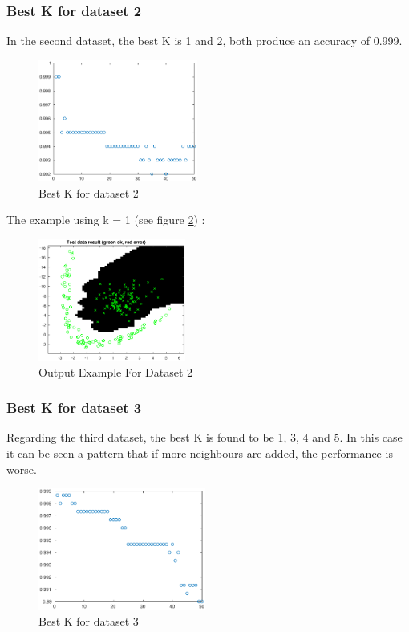 \documentclass{article}
\begin{document}
\subsubsection {Best K for dataset 2}
In the second dataset, the best K is 1 and 2, both produce an accuracy of 0.999.

\begin{figure}[H]
\centering
\includegraphics[height=4cm]{images/bestkdataset2}
\caption{Best K for dataset 2}
\label{fig:bestkdataset2}
\end{figure}

The example using k = 1 (see figure \ref{fig:resultsknn2}) :

\begin{figure}[H]
\centering
\includegraphics[height=4cm]{images/resultsknn2}
\caption{Output Example For Dataset 2}
\label{fig:resultsknn2}
\end{figure}


\subsubsection {Best K for dataset 3}
Regarding the third dataset, the best K is found to be 1, 3, 4 and 5. In this case it can be seen a pattern that if more neighbours are added, the performance is worse.

\begin{figure}[H]
\centering
\includegraphics[height=4cm]{images/bestkdataset3}
\caption{Best K for dataset 3}
\label{fig:bestkdataset3}
\end{figure}
\end{document}
